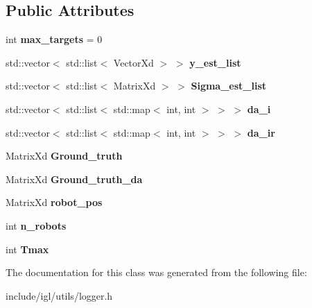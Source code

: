 \subsection*{Public Attributes}
\begin{DoxyCompactItemize}
\item 
\mbox{\label{classnx_1_1Logger_aa3506a88a672d3bc6eb9473b52622948}} 
int {\bfseries max\+\_\+targets} = 0
\item 
\mbox{\label{classnx_1_1Logger_ac65b9e29fd03448e942a583d71166b1a}} 
std\+::vector$<$ std\+::list$<$ Vector\+Xd $>$ $>$ {\bfseries y\+\_\+est\+\_\+list}
\item 
\mbox{\label{classnx_1_1Logger_a000119f552228bdf07c7550e4bb2b4c2}} 
std\+::vector$<$ std\+::list$<$ Matrix\+Xd $>$ $>$ {\bfseries Sigma\+\_\+est\+\_\+list}
\item 
\mbox{\label{classnx_1_1Logger_a51f038ccd6570dce012eddb6bfe056db}} 
std\+::vector$<$ std\+::list$<$ std\+::map$<$ int, int $>$ $>$ $>$ {\bfseries da\+\_\+i}
\item 
\mbox{\label{classnx_1_1Logger_ab2b15aed42a57becc31f4ee5151abf68}} 
std\+::vector$<$ std\+::list$<$ std\+::map$<$ int, int $>$ $>$ $>$ {\bfseries da\+\_\+ir}
\item 
\mbox{\label{classnx_1_1Logger_a0b60cc34934f4e18ef6836c0ffa29bcb}} 
Matrix\+Xd {\bfseries Ground\+\_\+truth}
\item 
\mbox{\label{classnx_1_1Logger_ad983be62737edf231f65219838817c9b}} 
Matrix\+Xd {\bfseries Ground\+\_\+truth\+\_\+da}
\item 
\mbox{\label{classnx_1_1Logger_aa83de5593f43e114f58a618e34b5398c}} 
Matrix\+Xd {\bfseries robot\+\_\+pos}
\item 
\mbox{\label{classnx_1_1Logger_a2c0d91651c288f69d44d8cc825faedf8}} 
int {\bfseries n\+\_\+robots}
\item 
\mbox{\label{classnx_1_1Logger_a51a5845a83ea3018ce7e9a4f4d127f7f}} 
int {\bfseries Tmax}
\end{DoxyCompactItemize}


The documentation for this class was generated from the following file\+:\begin{DoxyCompactItemize}
\item 
include/igl/utils/logger.\+h\end{DoxyCompactItemize}
